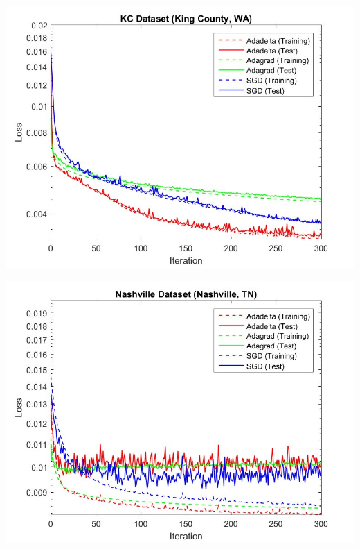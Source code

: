 \documentclass[10pt]{article}
\begin{document}
\begin{multicols}{2}
		\begin{center}
			\captionsetup{type=figure}
			\includegraphics[scale=0.27]{NeuralNet/fig_nn_04} \\
			\label{fig:fig_nn_result3}
		\end{center}

		\begin{center}
			\captionsetup{type=figure}
			\includegraphics[scale=0.27]{NeuralNet/fig_nn_05} \\
			\label{fig:fig_nn_result4}
		\end{center}
	

\end{multicols}
\end{document}

